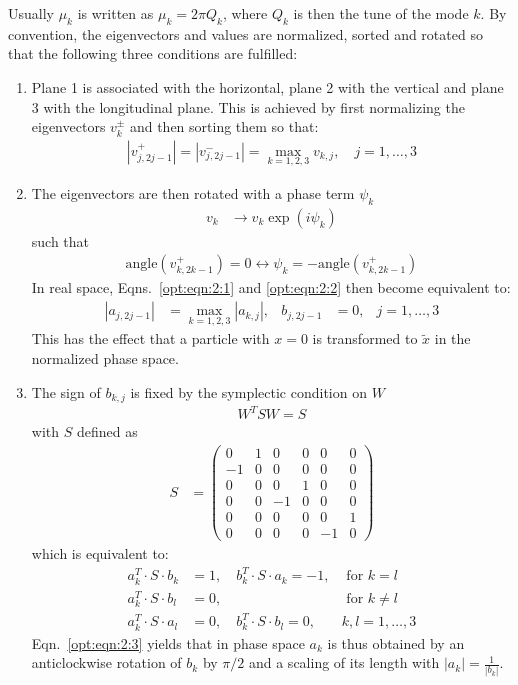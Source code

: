 Usually $\mu_k$ is written as $\mu_k=2\pi Q_k$, where $Q_k$ is then the tune of the mode $k$.
By convention, the eigenvectors and values are normalized, sorted and rotated so that the following three conditions are fulfilled:
\begin{enumerate}
\item Plane 1 is associated with the horizontal, plane 2 with the vertical and plane 3 with the longitudinal plane. This is achieved by first normalizing the eigenvectors $v_k^{\pm}$ and then sorting them so that:
\begin{align}\label{opt:eqn:2:1}
|v_{j,2j-1}^{+}| =|v_{j,2j-1}^{-}| = \max_{k=1,2,3} v_{k,j}, \quad j=1,\ldots, 3
\end{align}
\item The eigenvectors are then rotated with a phase term $\psi_k$
\begin{align}
v_k& \to v_k \exp(i \psi_k)
\end{align}
such that
\begin{align}\label{opt:eqn:2:2}
\mathrm{angle}(v_{k,2k-1}^{+})=0 \leftrightarrow \psi_k=-\mathrm{angle}(v_{k,2k-1}^{+})
\end{align}
In real space, Eqns.~\ref{opt:eqn:2:1} and \ref{opt:eqn:2:2} then become equivalent to:
\begin{align}
|a_{j,2j-1}| &=\max_{k=1,2,3} |a_{k,j}|,& b_{j,2 j-1}&=0, & j=1,\ldots, 3
\end{align}
This has the effect that a particle with $x=0$ is transformed to $\tilde x$ in the normalized phase space.
\item The sign of $b_{k,j}$ is fixed by the symplectic condition on $W$
\begin{align}
W^T S W = S
\end{align}
with $S$ defined as
\begin{align}
S&=\left(
\begin{array}{cccccc}
0 & 1 & 0 & 0 & 0 & 0\\
-1 & 0 & 0 & 0 & 0 & 0\\
0 & 0 & 0 & 1 & 0 & 0\\
0 & 0 & -1 & 0 & 0 & 0\\
0 & 0 & 0 & 0 & 0 & 1\\
0 & 0 & 0 & 0 & -1 & 0
\end{array}
\right)
\label{eq:symplectic_matrix}
\end{align}
which is equivalent to:
\begin{align}\label{opt:eqn:2:3}
a_k^T \cdot S \cdot b_k &=1, \quad b_k^T \cdot S \cdot a_k =-1, & \text{ for } k=l\nonumber\\
a_k^T \cdot S \cdot b_l &=0, & \text{ for }  k\not=l\\
a_k^T \cdot S \cdot a_l &=0, \quad b_k^T \cdot S \cdot b_l =0,  & k,l=1,\ldots,3 \nonumber
\end{align}
Eqn.~\ref{opt:eqn:2:3} yields that in phase space $a_k$ is thus obtained by an anticlockwise rotation of $b_k$ by $\pi/2$ and a scaling of its length with $|a_k|=\frac{1}{|b_k|}$.
\end{enumerate}


